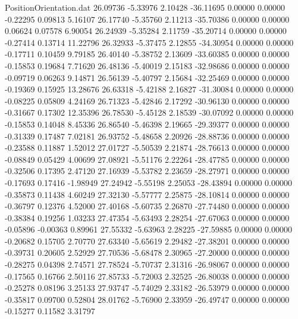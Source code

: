 \begin{filecontents}{PositionOrientation.dat}
  26.09736   -5.33976    2.10428   -36.11695    0.00000    0.00000   -0.22295    0.09813    5.16107
  26.17740   -5.35760    2.11213   -35.70386    0.00000    0.00000    0.06624    0.07578    6.90054
  26.24939   -5.35284    2.11759   -35.20714    0.00000    0.00000   -0.27414    0.13714   11.22796
  26.32933   -5.37475    2.12855   -34.30954    0.00000    0.00000   -0.17711    0.10459    9.79185
  26.40140   -5.38752    2.13609   -33.60385    0.00000    0.00000   -0.15853    0.19684    7.71620
  26.48136   -5.40019    2.15183   -32.98686    0.00000    0.00000   -0.09719    0.06263    9.14871
  26.56139   -5.40797    2.15684   -32.25469    0.00000    0.00000   -0.19369    0.15925   13.28676
  26.63318   -5.42188    2.16827   -31.30084    0.00000    0.00000   -0.08225    0.05809    4.24169
  26.71323   -5.42846    2.17292   -30.96130    0.00000    0.00000   -0.31667    0.17302   12.35396
  26.78530   -5.45128    2.18539   -30.07092    0.00000    0.00000   -0.15853    0.14048    8.45336
  26.86540   -5.46398    2.19665   -29.39377    0.00000    0.00000   -0.31339    0.17487    7.02181
  26.93752   -5.48658    2.20926   -28.88736    0.00000    0.00000   -0.23588    0.11887    1.52012
  27.01727   -5.50539    2.21874   -28.76613    0.00000    0.00000   -0.08849    0.05429    4.00699
  27.08921   -5.51176    2.22264   -28.47785    0.00000    0.00000   -0.32506    0.17395    2.47120
  27.16939   -5.53782    2.23659   -28.27971    0.00000    0.00000   -0.17693    0.17416   -1.98949
  27.24942   -5.55198    2.25053   -28.43894    0.00000    0.00000   -0.35873    0.11438    4.60249
  27.32130   -5.57777    2.25875   -28.10814    0.00000    0.00000   -0.36797    0.12376    4.52000
  27.40168   -5.60735    2.26870   -27.74480    0.00000    0.00000   -0.38384    0.19256    1.03233
  27.47354   -5.63493    2.28254   -27.67063    0.00000    0.00000   -0.05896   -0.00363    0.89961
  27.55332   -5.63963    2.28225   -27.59885    0.00000    0.00000   -0.20682    0.15705    2.70770
  27.63340   -5.65619    2.29482   -27.38201    0.00000    0.00000   -0.39731    0.20605    2.52929
  27.70536   -5.68478    2.30965   -27.20000    0.00000    0.00000   -0.28275    0.04398    2.74571
  27.78524   -5.70737    2.31316   -26.98067    0.00000    0.00000   -0.17565    0.16766    2.50116
  27.85733   -5.72003    2.32525   -26.80038    0.00000    0.00000   -0.25278    0.08196    3.25133
  27.93747   -5.74029    2.33182   -26.53979    0.00000    0.00000   -0.35817    0.09700    0.52804
  28.01762   -5.76900    2.33959   -26.49747    0.00000    0.00000   -0.15277    0.11582    3.31797

\end{filecontents}
